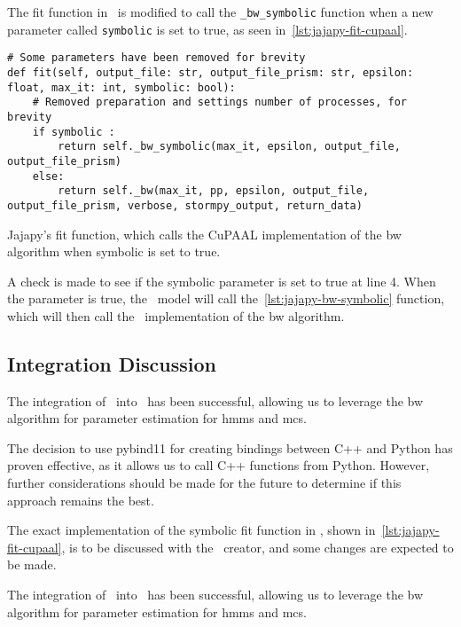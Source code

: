 The fit function in \Jajapy\ is modified to call the \texttt{\_bw\_symbolic} function when a new parameter called \texttt{symbolic} is set to true, as seen in~\autoref{lst:jajapy-fit-cupaal}.


\begin{listing}
    \begin{verbatim}
# Some parameters have been removed for brevity
def fit(self, output_file: str, output_file_prism: str, epsilon: float, max_it: int, symbolic: bool):
    # Removed preparation and settings number of processes, for brevity
    if symbolic :
        return self._bw_symbolic(max_it, epsilon, output_file, output_file_prism)
    else:
        return self._bw(max_it, pp, epsilon, output_file, output_file_prism, verbose, stormpy_output, return_data)
      \end{verbatim}
    \caption{Jajapy's fit function, which calls the CuPAAL implementation of the \gls{bw} algorithm when symbolic is set to true.}
    \label{lst:jajapy-fit-cupaal}
\end{listing}

A check is made to see if the symbolic parameter is set to true at line 4. When the parameter is true, the \Jajapy\ model will call the~\autoref{lst:jajapy-bw-symbolic} function, which will then call the \Cupaal\ implementation of the \gls{bw} algorithm.

\subsection{Integration Discussion}\label{subsec:integration-discussion}
The integration of \Cupaal\ into \Jajapy\ has been successful, allowing us to leverage the \gls{bw} algorithm for parameter estimation for \glspl{hmm} and \glspl{mc}.

The decision to use pybind11 for creating bindings between C++ and Python has proven effective, as it allows us to call C++ functions from Python. However, further considerations should be made for the future to determine if this approach remains the best.

The exact implementation of the symbolic fit function in \Jajapy, shown in~\autoref{lst:jajapy-fit-cupaal}, is to be discussed with the \Jajapy\ creator, and some changes are expected to be made.

The integration of \Cupaal\ into \Jajapy\ has been successful, allowing us to leverage the \gls{bw} algorithm for parameter estimation for \glspl{hmm} and \glspl{mc}.
